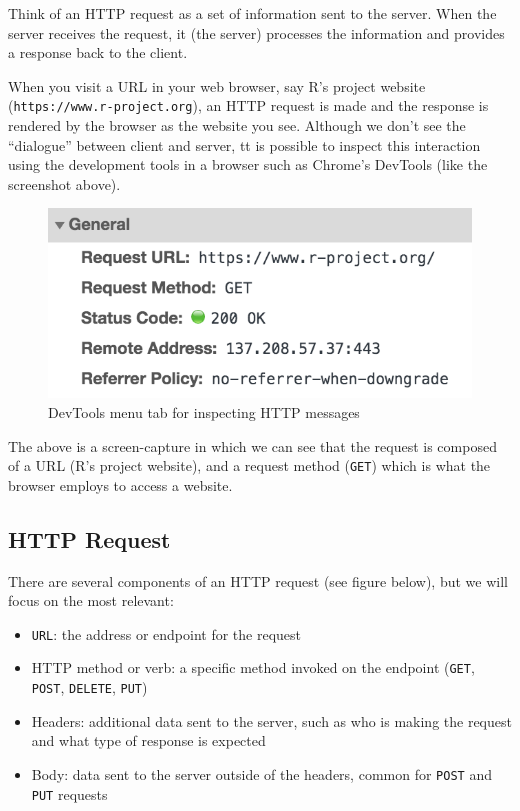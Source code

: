 \documentclass[
]{book}
\begin{document}
Think of an HTTP request as a set of information sent to the server. When the
server receives the request, it (the server) processes the information and
provides a response back to the client.

When you visit a URL in your web browser, say R's project website
(\texttt{https://www.r-project.org}), an HTTP request is made and the response is
rendered by the browser as the website you see. Although we don't see the
``dialogue'' between client and server, tt is possible to inspect this
interaction using the development tools in a browser such as Chrome's DevTools
(like the screenshot above).

\begin{figure}

{\centering \includegraphics[width=0.4\linewidth]{images/http/web-http-headers} 

}

\caption{DevTools menu tab for inspecting HTTP messages}\label{fig:unnamed-chunk-12}
\end{figure}

The above is a screen-capture in which we can see that the request is composed
of a URL (R's project website), and a request method (\texttt{GET}) which is what the
browser employs to access a website.

\hypertarget{http-request}{%
\subsection{HTTP Request}\label{http-request}}

There are several components of an HTTP request (see figure below), but we
will focus on the most relevant:

\begin{itemize}
\item
  \texttt{URL}: the address or endpoint for the request
\item
  HTTP method or verb: a specific method invoked on the endpoint
  (\texttt{GET}, \texttt{POST}, \texttt{DELETE}, \texttt{PUT})
\item
  Headers: additional data sent to the server, such as who is making the request
  and what type of response is expected
\item
  Body: data sent to the server outside of the headers, common for \texttt{POST} and
  \texttt{PUT} requests
\end{itemize}
\end{document}
